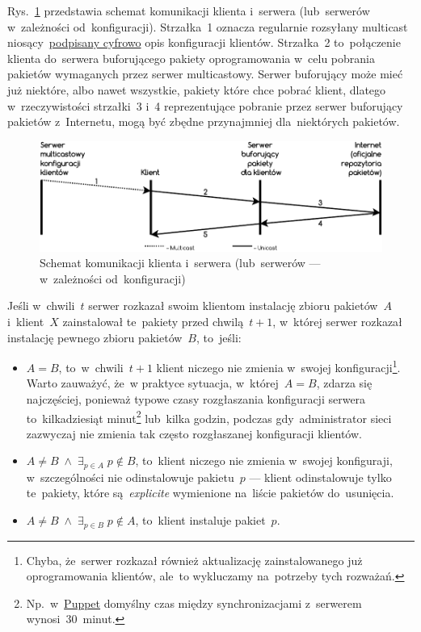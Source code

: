 \documentclass[thesis]{subfiles}
\begin{document}
Rys.~\ref{fig:schemat-komunikacji} przedstawia schemat komunikacji klienta i~serwera (lub~serwerów w~zależności od~konfiguracji). Strzałka~1 oznacza regularnie rozsyłany multicast niosący~\hyperref[sec:security]{podpisany cyfrowo} opis konfiguracji klientów. Strzałka~2 to~połączenie klienta do~serwera buforującego pakiety oprogramowania w~celu pobrania pakietów wymaganych przez serwer multicastowy. Serwer buforujący może mieć już niektóre, albo nawet wszystkie, pakiety które chce pobrać klient, dlatego w~rzeczywistości strzałki~3 i~4 reprezentujące pobranie przez serwer buforujący pakietów z~Internetu, mogą być zbędne przynajmniej dla~niektórych pakietów.

\begin{figure}
	\centering
	\includegraphics[width=\textwidth]{img/schemat-komunikacji}
	\caption{Schemat komunikacji klienta i~serwera (lub~serwerów --- w~zależności od~konfiguracji)}
	\label{fig:schemat-komunikacji}
\end{figure}

Jeśli w~chwili~$t$ serwer rozkazał swoim klientom instalację zbioru pakietów~$A$ i~klient~$X$ zainstalował te~pakiety przed chwilą~$t+1$, w~której serwer rozkazał instalację pewnego zbioru pakietów~$B$, to~jeśli:\mynobreakpar

\begin{itemize}
	\item $A=B$, to~w~chwili~$t+1$ klient niczego nie zmienia w~swojej konfiguracji\footnote{Chyba, że~serwer rozkazał również aktualizację zainstalowanego już oprogramowania klientów, ale~to wykluczamy na~potrzeby tych rozważań.}. Warto zauważyć, że~w praktyce sytuacja, w~której~$A=B$, zdarza się najczęściej, ponieważ typowe czasy rozgłaszania konfiguracji serwera to~kilkadziesiąt minut\footnote{Np.~w~\hyperref[sec:puppet]{Puppet} domyślny czas między synchronizacjami z~serwerem wynosi~30~minut.} lub~kilka godzin, podczas gdy~administrator sieci zazwyczaj nie zmienia tak często rozgłaszanej konfiguracji klientów.
	\item $A\neq B\;\wedge\;\exists_{p\in A}\;p\not\in B$, to~klient niczego nie zmienia w~swojej konfiguraji, w~szczególności nie odinstalowuje pakietu~$p$ --- klient odinstalowuje tylko te~pakiety, które są~\emph{explicite} wymienione na~liście pakietów do~usunięcia.
	\item $A\neq B\;\wedge\;\exists_{p\in B}\;p\not\in A$, to~klient instaluje pakiet~$p$.
\end{itemize}
\end{document}
